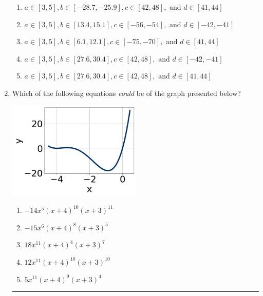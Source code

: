 \documentclass[14pt]{extbook}
\newcommand{\litem}[1]{\item#1\hspace*{-1cm}\rule{\textwidth}{0.4pt}}
\begin{document}
\begin{enumerate}
{\begin{enumerate}[label=\Alph*.]
\item \( a \in [3, 5], b \in [-28.7, -25.9], c \in [42, 48], \text{ and } d \in [41, 44] \)
\item \( a \in [3, 5], b \in [13.4, 15.1], c \in [-56, -54], \text{ and } d \in [-42, -41] \)
\item \( a \in [3, 5], b \in [6.1, 12.1], c \in [-75, -70], \text{ and } d \in [41, 44] \)
\item \( a \in [3, 5], b \in [27.6, 30.4], c \in [42, 48], \text{ and } d \in [-42, -41] \)
\item \( a \in [3, 5], b \in [27.6, 30.4], c \in [42, 48], \text{ and } d \in [41, 44] \)

\end{enumerate} }
\litem{
Which of the following equations \textit{could} be of the graph presented below?
\begin{center}
    \includegraphics[width=0.5\textwidth]{../Figures/polyGraphToFunctionCopyC.png}
\end{center}
\begin{enumerate}[label=\Alph*.]
\item \( -14x^{5} (x + 4)^{10} (x + 3)^{11} \)
\item \( -15x^{6} (x + 4)^{8} (x + 3)^{5} \)
\item \( 18x^{11} (x + 4)^{4} (x + 3)^{7} \)
\item \( 12x^{11} (x + 4)^{10} (x + 3)^{10} \)
\item \( 5x^{11} (x + 4)^{9} (x + 3)^{4} \)


\end{enumerate}}
\end{enumerate}
\end{document}
